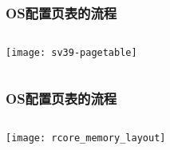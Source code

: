 \begin{frame} 
	\frametitle{OS配置页表的流程}
	
	\begin{columns}
		
		\begin{column}{1.\textwidth}
			\centering
			\texttt{[image: sv39-pagetable]}
			
		\end{column}
		
		
		\begin{column}{.1\textwidth}
			
%					
			
		\end{column}
		
		
	\end{columns}
\end{frame}


\begin{frame} 
	\frametitle{OS配置页表的流程}
	
	\begin{columns}
		
		\begin{column}{1.\textwidth}
			\centering
			\texttt{[image: rcore\_memory\_layout]}
			
		\end{column}
		
		
		\begin{column}{.1\textwidth}
			
			
		\end{column}
		
		
	\end{columns}
\end{frame}



